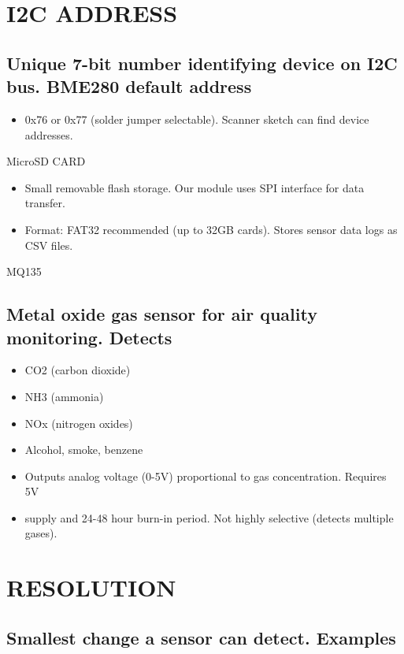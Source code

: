 \documentclass[11pt,letterpaper]{article}
\begin{document}
\section{I2C ADDRESS}

\subsection{Unique 7-bit number identifying device on I2C bus. BME280 default address}

\begin{itemize}
  \item 0x76 or 0x77 (solder jumper selectable). Scanner sketch can find device addresses.
\end{itemize}

MicroSD CARD\par

\begin{itemize}
  \item Small removable flash storage. Our module uses SPI interface for data transfer.
  \item Format: FAT32 recommended (up to 32GB cards). Stores sensor data logs as CSV files.
\end{itemize}

MQ135\par

\subsection{Metal oxide gas sensor for air quality monitoring. Detects}

\begin{itemize}
  \item CO2 (carbon dioxide)
  \item NH3 (ammonia)
  \item NOx (nitrogen oxides)
  \item Alcohol, smoke, benzene
  \item Outputs analog voltage (0-5V) proportional to gas concentration. Requires 5V
  \item supply and 24-48 hour burn-in period. Not highly selective (detects multiple gases).
\end{itemize}

\section{RESOLUTION}

\subsection{Smallest change a sensor can detect. Examples}
\end{document}
